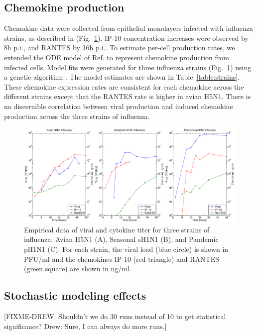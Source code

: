 \documentclass[10pt]{article}
\begin{document}
\subsection*{Chemokine production}

Chemokine data were collected from epithelial monolayers infected with influenza strains, as described in \cite{MitchellEtAl2011} (Fig.~\ref{fig:data}).  IP-10 concentration increases were observed by 8h p.i., and RANTES by 16h p.i..  To estimate per-cell production rates, we extended the ODE model of Ref. \cite{MitchellEtAl2011} to represent chemokine production from infected cells.  Model fits were generated for three influenza strains (Fig.~\ref{fig:data}) using a genetic algorithm \cite{GA-ref}.  The model estimates are shown in Table~\ref{table:strains}.  These chemokine expression rates are consistent for each chemokine across the different strains except that the RANTES rate is higher in avian H5N1.  There is no discernible correlation between viral production and induced chemokine production across the three strains of influenza.

\begin{figure}[ht!]
\begin{center}
 \includegraphics[width=.9\textwidth]{data}
 \end{center}
\caption{Empirical data of viral and cytokine titer for three strains of influenza: Avian H5N1 (A), Seasonal sH1N1 (B), and Pandemic pH1N1 (C).  For each strain, the viral load (blue circle) is shown in PFU/ml and the chemokines IP-10 (red triangle) and RANTES (green square) are shown in ng/ml.} 
 \label{fig:data}
\end{figure}

\subsection*{Stochastic modeling effects}

[FIXME-DREW: Shouldn't we do 30 runs instead of 10 to get statistical significance?   Drew: Sure, I can always do more runs.]
\end{document}
